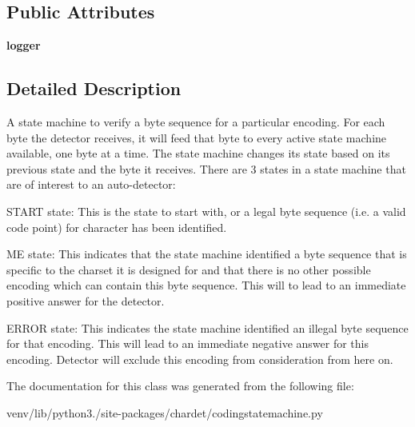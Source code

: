 \subsection*{Public Attributes}
\begin{DoxyCompactItemize}
\item 
\mbox{\label{classchardet_1_1codingstatemachine_1_1_coding_state_machine_acfcd9270346ae96890c015a313c78876}} 
{\bfseries logger}
\end{DoxyCompactItemize}


\subsection{Detailed Description}
\begin{DoxyVerb}A state machine to verify a byte sequence for a particular encoding. For
each byte the detector receives, it will feed that byte to every active
state machine available, one byte at a time. The state machine changes its
state based on its previous state and the byte it receives. There are 3
states in a state machine that are of interest to an auto-detector:

START state: This is the state to start with, or a legal byte sequence
             (i.e. a valid code point) for character has been identified.

ME state:  This indicates that the state machine identified a byte sequence
           that is specific to the charset it is designed for and that
           there is no other possible encoding which can contain this byte
           sequence. This will to lead to an immediate positive answer for
           the detector.

ERROR state: This indicates the state machine identified an illegal byte
             sequence for that encoding. This will lead to an immediate
             negative answer for this encoding. Detector will exclude this
             encoding from consideration from here on.
\end{DoxyVerb}
 

The documentation for this class was generated from the following file\+:\begin{DoxyCompactItemize}
\item 
venv/lib/python3./site-\/packages/chardet/codingstatemachine.\+py\end{DoxyCompactItemize}
